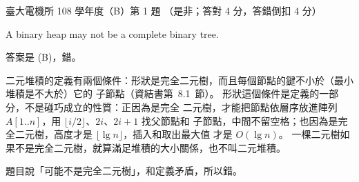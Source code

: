 \begin{pastexam}[label={px:ntu-108-ee-dsb-01}]{臺大電機所 108 學年度（B）第 1 題}
（是非；答對 4 分，答錯倒扣 4 分）

A binary heap may not be a complete binary tree.
\end{pastexam}

\begin{pastsoln}
答案是 (B)，錯。

二元堆積的定義有兩個條件：形狀是完全二元樹，而且每個節點的鍵不小於（最小堆積是不大於）它的
子節點（資結書第~8.1~節）。 形狀這個條件是定義的一部分，不是碰巧成立的性質：正因為是完全
二元樹，才能把節點依層序放進陣列 $A[1..n]$，用 $\lfloor i/2 \rfloor$、$2i$、$2i+1$ 找父節點和
子節點，中間不留空格；也因為是完全二元樹，高度才是 $\lfloor \lg n \rfloor$，插入和取出最大值
才是 $O(\lg n)$。 一棵二元樹如果不是完全二元樹，就算滿足堆積的大小關係，也不叫二元堆積。

題目說「可能不是完全二元樹」，和定義矛盾，所以錯。
\end{pastsoln}
